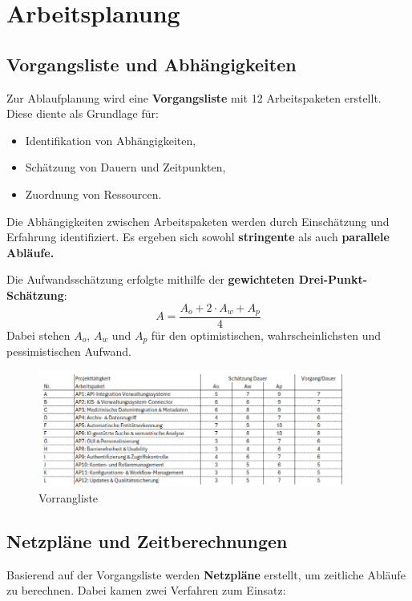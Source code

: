 {\let\clearpage\relax
\chapter{Arbeitsplanung}}
\label{sec:ablaufplanung}

\section{Vorgangsliste und Abhängigkeiten}
Zur Ablaufplanung wird eine \textbf{Vorgangsliste} mit 12 Arbeitspaketen erstellt. Diese diente als Grundlage für:
\begin{itemize}
  \item Identifikation von Abhängigkeiten,
  \item Schätzung von Dauern und Zeitpunkten,
  \item Zuordnung von Ressourcen.
\end{itemize}

Die Abhängigkeiten zwischen Arbeitspaketen werden durch Einschätzung und Erfahrung identifiziert. Es ergeben sich sowohl \textbf{stringente} als auch \textbf{parallele Abläufe.}

Die Aufwandsschätzung erfolgte mithilfe der \textbf{gewichteten Drei-Punkt-Schätzung}:
\[
A = \frac{A_o + 2 \cdot A_w + A_p}{4}
\]
Dabei stehen $A_o$, $A_w$ und $A_p$ für den optimistischen, wahrscheinlichsten und pessimistischen Aufwand.

\begin{figure}[ht]
	\centering
	\includegraphics[width=0.9\textwidth]{fig/vorrangliste.png}
	\caption{Vorrangliste}
	\label{fig:vorrangliste}
\end{figure}

\section{Netzpläne und Zeitberechnungen}
Basierend auf der Vorgangsliste werden \textbf{Netzpläne} erstellt, um zeitliche Abläufe zu berechnen. Dabei kamen zwei Verfahren zum Einsatz:

